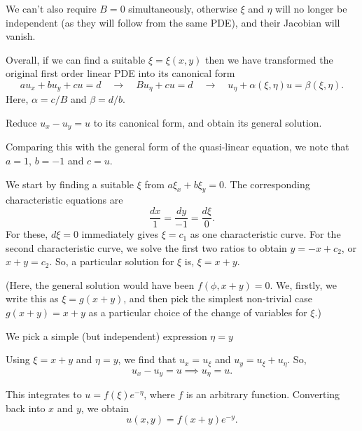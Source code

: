 \documentclass[11pt]{penrose}
\begin{document}
We can't also require $B = 0$ simultaneously, otherwise $\xi$ and $\eta$ will no longer be independent (as they will follow from the same PDE), and their Jacobian will vanish.

Overall, if we can find a suitable $\xi = \xi(x,y)$ then we have transformed the original first order linear PDE into its canonical form
\begin{equation}
    a u_x + b u_y + c u = d
    \quad\to\quad B u_\eta + cu = d
    \quad\to\quad u_\eta + \alpha(\xi, \eta) u = \beta(\xi, \eta).
\end{equation}
Here, $\alpha = c/B$ and $\beta = d/b$.

\begin{negg}
    Reduce $u_x - u_y = u$ to its canonical form, and obtain its general solution.

    Comparing this with the general form of the quasi-linear equation, we note that $a = 1$, $b = -1$ and $c = u$.

    We start by finding a suitable $\xi$ from $a \xi_x + b \xi_y = 0$. The corresponding characteristic equations are
    \begin{equation*}
        \frac{dx}{1} = \frac{dy}{-1} = \frac{d\xi}{0}.
    \end{equation*}
    For these, $d\xi = 0$ immediately gives $\xi = c_1$ as one characteristic curve. For the second characteristic curve, we solve the first two ratios to obtain $y = -x + c_2$, or $x + y = c_2$. So, a particular solution for $\xi$ is, $\xi = x+y$.

    (Here, the general solution would have been $f(\phi, x+y) = 0$. We, firstly, we write this as $\xi = g(x+y)$, and then pick the simplest non-trivial case $g(x+y) = x+y$ as a particular choice of the change of variables for $\xi$.)

    We pick a simple (but independent) expression $\eta = y$

    Using $\xi = x+y$ and $\eta = y$, we find that $u_x = u_\xi$ and $u_y = u_\xi + u_\eta$. So,
    \begin{equation}
        u_x - u_y = u
        \implies
        u_\eta = u.
    \end{equation}

    This integrates to $u = f(\xi) e^{-\eta}$, where $f$ is an arbitrary function. Converting back into $x$ and $y$, we obtain
    \begin{equation}
        u(x, y) = f(x+y) e^{-y}.
    \end{equation}
\end{negg}
\end{document}
